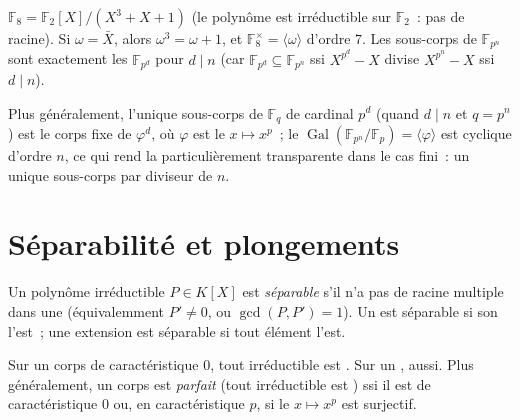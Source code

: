 \begin{example}\label{ex:b3:galois:f8}
$\mathbb F_8 = \mathbb F_2[X]/(X^3 + X + 1)$ (le polynôme est
irréductible sur $\mathbb F_2$~: pas de racine). Si $\omega =
\bar X$, alors $\omega^3 = \omega + 1$, et $\mathbb F_8^\times =
\langle \omega \rangle$ d'ordre $7$. Les sous-corps de $\mathbb
F_{p^n}$ sont exactement les $\mathbb F_{p^d}$ pour $d \mid n$
(car $\mathbb F_{p^d} \subseteq \mathbb F_{p^n}$ ssi $X^{p^d} -
X$ divise $X^{p^n} - X$ ssi $d \mid n$).

Plus généralement, l'unique sous-corps de $\mathbb F_{q}$ de
cardinal $p^d$ (quand $d \mid n$ et $q = p^n$) est le corps fixe
de $\varphi^d$, où $\varphi$ est le  $x \mapsto x^p$~;
le  $\operatorname{Gal}(\mathbb F_{p^n}/\mathbb
F_p) = \langle \varphi \rangle$ est cyclique d'ordre $n$, ce
qui rend la  particulièrement
transparente dans le cas fini~: un unique sous-corps par
diviseur de $n$.
\end{example}

\section{Séparabilité et plongements}

\begin{definition}\label{def:b3:galois:separable}
Un polynôme irréductible $P \in K[X]$ est
\emph{séparable} s'il n'a pas de
racine multiple dans une  (équivalemment $P'
\neq 0$, ou $\gcd(P, P') = 1$). Un  est
séparable si son  l'est~; une extension
 est séparable si tout élément l'est.
\end{definition}

\begin{proposition}\label{prop:b3:galois:perfect}
Sur un corps de caractéristique $0$, tout irréductible est
. Sur un , aussi. Plus généralement, un corps
est \emph{parfait} (tout irréductible est
) ssi il est de caractéristique $0$ ou, en
caractéristique $p$, si le  $x \mapsto x^p$ est
surjectif.
\end{proposition}

